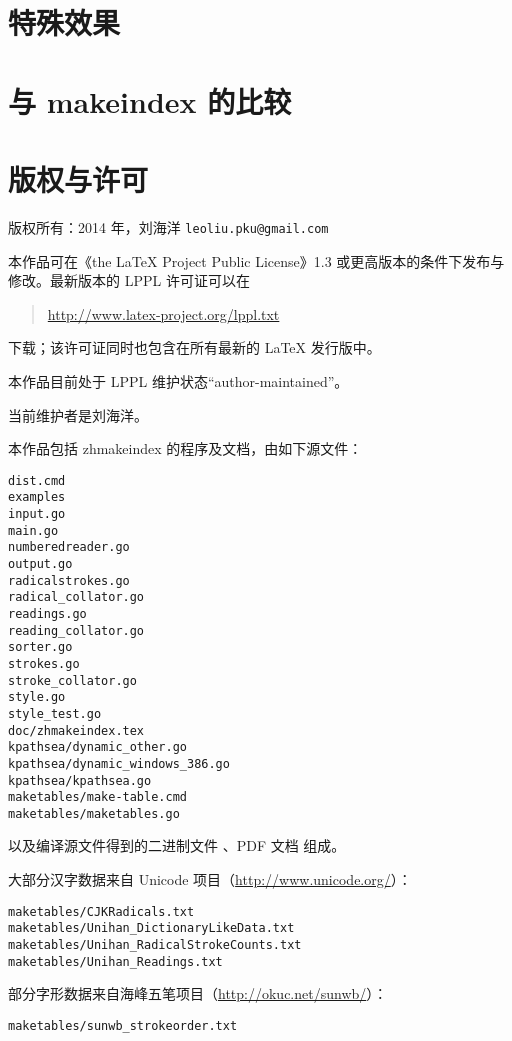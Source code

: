 \documentclass[UTF8,hyperref]{ctexart}
\newcommand\pkg{\textsf}
\newcommand\email{\nolinkurl}
\begin{document}
\section{特殊效果}

\section{与 \pkg{makeindex} 的比较}

\section{版权与许可}

版权所有：2014 年，刘海洋 \email{leoliu.pku@gmail.com}

本作品可在《the \LaTeX{} Project Public License》1.3 或更高版本的条件下发布与
修改。最新版本的 LPPL 许可证可以在
\begin{quote}
  \url{http://www.latex-project.org/lppl.txt}
\end{quote}
下载；该许可证同时也包含在所有最新的 \LaTeX{} 发行版中。

本作品目前处于 LPPL 维护状态“author-maintained”。

当前维护者是刘海洋。

本作品包括 \pkg{zhmakeindex} 的程序及文档，由如下源文件：
\begin{verbatim}
dist.cmd
examples
input.go
main.go
numberedreader.go
output.go
radicalstrokes.go
radical_collator.go
readings.go
reading_collator.go
sorter.go
strokes.go
stroke_collator.go
style.go
style_test.go
doc/zhmakeindex.tex
kpathsea/dynamic_other.go
kpathsea/dynamic_windows_386.go
kpathsea/kpathsea.go
maketables/make-table.cmd
maketables/maketables.go
\end{verbatim}
以及编译源文件得到的二进制文件 、PDF 文档
 组成。

大部分汉字数据来自 Unicode 项目（\url{http://www.unicode.org/}）：
\begin{verbatim}
maketables/CJKRadicals.txt
maketables/Unihan_DictionaryLikeData.txt
maketables/Unihan_RadicalStrokeCounts.txt
maketables/Unihan_Readings.txt
\end{verbatim}

部分字形数据来自海峰五笔项目（\url{http://okuc.net/sunwb/}）：
\begin{verbatim}
maketables/sunwb_strokeorder.txt
\end{verbatim}
\end{document}
